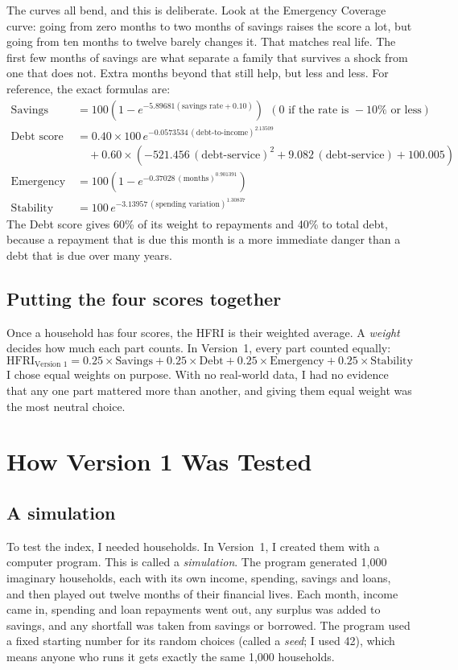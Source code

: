 \documentclass[11pt,a4paper]{article}
\newcommand{\pct}{\%}
\begin{document}
The curves all bend, and this is deliberate. Look at the Emergency Coverage curve: going from zero months to two months
of savings raises the score a lot, but going from ten months to twelve barely changes it. That matches real life. The
first few months of savings are what separate a family that survives a shock from one that does not. Extra months
beyond that still help, but less and less. For reference, the exact formulas are:
\begin{align*}
\text{Savings score} &= 100\left(1-e^{-5.89681(\text{savings rate}+0.10)}\right)\ \ (\text{0 if the rate is } -10\pct \text{ or less})\\
\text{Debt score} &= 0.40 \times 100\,e^{-0.0573534\,(\text{debt-to-income})^{2.13509}}\\
&\quad + 0.60 \times \left(-521.456\,(\text{debt-service})^2 + 9.082\,(\text{debt-service}) + 100.005\right)\\
\text{Emergency score} &= 100\left(1-e^{-0.37028\,(\text{months})^{0.901391}}\right)\\
\text{Stability score} &= 100\,e^{-3.13957\,(\text{spending variation})^{1.30837}}
\end{align*}
The Debt score gives 60\pct{} of its weight to repayments and 40\pct{} to total debt, because a repayment that is
due this month is a more immediate danger than a debt that is due over many years.

\subsection{Putting the four scores together}
Once a household has four scores, the HFRI is their weighted average. A \emph{weight} decides how much each part counts.
In Version~1, every part counted equally:
\[
\text{HFRI}_{\text{Version 1}} = 0.25\times\text{Savings} + 0.25\times\text{Debt} + 0.25\times\text{Emergency} + 0.25\times\text{Stability}
\]
I chose equal weights on purpose. With no real-world data, I had no evidence that any one part mattered more than
another, and giving them equal weight was the most neutral choice.

\section{How Version 1 Was Tested}
\subsection{A simulation}
To test the index, I needed households. In Version~1, I created them with a computer program. This is called a
\emph{simulation}. The program generated 1,000 imaginary households, each with its own income, spending, savings and
loans, and then played out twelve months of their financial lives. Each month, income came in, spending and loan
repayments went out, any surplus was added to savings, and any shortfall was taken from savings or borrowed. The
program used a fixed starting number for its random choices (called a \emph{seed}; I used 42), which means anyone who
runs it gets exactly the same 1,000 households.
\end{document}
